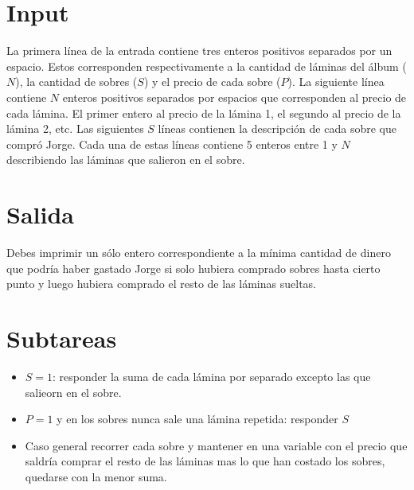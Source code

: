 \documentclass{article}
\begin{document}
\section*{Input}

La primera línea de la entrada contiene tres enteros positivos separados por un
espacio. Estos corresponden respectivamente a la cantidad de láminas del álbum
($N$), la cantidad de sobres ($S$) y el precio de cada sobre ($P$). La siguiente
línea contiene $N$ enteros positivos separados por espacios que corresponden
al precio de cada lámina. El primer entero al precio de la lámina 1, el segundo
al precio de la lámina 2, etc. Las siguientes $S$ líneas contienen la
descripción de cada sobre que compró Jorge. Cada una de estas líneas contiene 5
enteros entre 1 y $N$ describiendo las láminas que salieron en el sobre.

\section*{Salida}

Debes imprimir un sólo entero correspondiente a la mínima cantidad de dinero que
podría haber gastado Jorge si solo hubiera comprado sobres hasta cierto punto y
luego hubiera comprado el resto de las láminas sueltas.

\section*{Subtareas}

\begin{itemize}
  \item $S=1$: responder la suma de cada lámina por separado excepto las que salieorn en el sobre.
  \item $P=1$ y en los sobres nunca sale una lámina repetida: responder $S$
  \item Caso general recorrer cada sobre y mantener en una variable con el precio que saldría comprar el resto de las láminas mas lo que han costado los sobres, quedarse con la menor suma.
\end{itemize}

 
\end{document}
